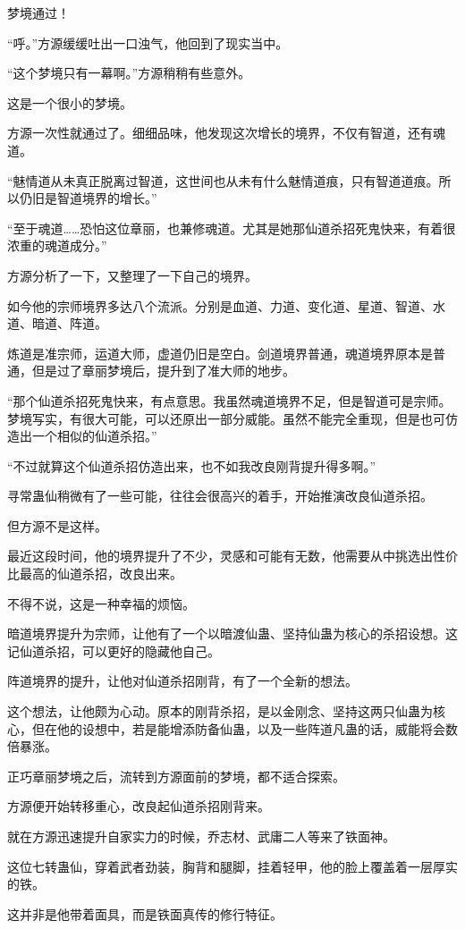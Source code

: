 \begin{this_body}
梦境通过！

“呼。”方源缓缓吐出一口浊气，他回到了现实当中。

“这个梦境只有一幕啊。”方源稍稍有些意外。

这是一个很小的梦境。

方源一次性就通过了。细细品味，他发现这次增长的境界，不仅有智道，还有魂道。

“魅情道从未真正脱离过智道，这世间也从未有什么魅情道痕，只有智道道痕。所以仍旧是智道境界的增长。”

“至于魂道……恐怕这位章丽，也兼修魂道。尤其是她那仙道杀招死鬼快来，有着很浓重的魂道成分。”

方源分析了一下，又整理了一下自己的境界。

如今他的宗师境界多达八个流派。分别是血道、力道、变化道、星道、智道、水道、暗道、阵道。

炼道是准宗师，运道大师，虚道仍旧是空白。剑道境界普通，魂道境界原本是普通，但是过了章丽梦境后，提升到了准大师的地步。

“那个仙道杀招死鬼快来，有点意思。我虽然魂道境界不足，但是智道可是宗师。梦境写实，有很大可能，可以还原出一部分威能。虽然不能完全重现，但是也可仿造出一个相似的仙道杀招。”

“不过就算这个仙道杀招仿造出来，也不如我改良刚背提升得多啊。”

寻常蛊仙稍微有了一些可能，往往会很高兴的着手，开始推演改良仙道杀招。

但方源不是这样。

最近这段时间，他的境界提升了不少，灵感和可能有无数，他需要从中挑选出性价比最高的仙道杀招，改良出来。

不得不说，这是一种幸福的烦恼。

暗道境界提升为宗师，让他有了一个以暗渡仙蛊、坚持仙蛊为核心的杀招设想。这记仙道杀招，可以更好的隐藏他自己。

阵道境界的提升，让他对仙道杀招刚背，有了一个全新的想法。

这个想法，让他颇为心动。原本的刚背杀招，是以金刚念、坚持这两只仙蛊为核心，但在他的设想中，若是能增添防备仙蛊，以及一些阵道凡蛊的话，威能将会数倍暴涨。

正巧章丽梦境之后，流转到方源面前的梦境，都不适合探索。

方源便开始转移重心，改良起仙道杀招刚背来。

就在方源迅速提升自家实力的时候，乔志材、武庸二人等来了铁面神。

这位七转蛊仙，穿着武者劲装，胸背和腿脚，挂着轻甲，他的脸上覆盖着一层厚实的铁。

这并非是他带着面具，而是铁面真传的修行特征。


\end{this_body}
